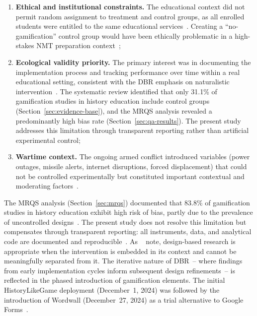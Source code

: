 \begin{enumerate}
\item \textbf{Ethical and institutional constraints.} The educational context did not permit random assignment to treatment and control groups, as all enrolled students were entitled to the same educational services~\cite{Sanina2020}. Creating a ``no-gamification'' control group would have been ethically problematic in a high-stakes NMT preparation context~\cite{CampbellStanley1963, ShadishCookCampbell2002};
\item \textbf{Ecological validity priority.} The primary interest was in documenting the implementation process and tracking performance over time within a real educational setting, consistent with the DBR emphasis on naturalistic intervention~\cite{Reeves2003, WangHannafin2005}. The systematic review identified that only 31.1\% of gamification studies in history education include control groups (Section~\ref{sec:evidence-base}), and the MRQS analysis revealed a predominantly high bias rate (Section~\ref{sec:qa-results}). The present study addresses this limitation through transparent reporting rather than artificial experimental control;
\item \textbf{Wartime context.} The ongoing armed conflict introduced variables (power outages, missile alerts, internet disruptions, forced displacement) that could not be controlled experimentally but constituted important contextual and moderating factors~\cite{Martynets202428, UNESCO2023, Burde2017, Kirk2007}.
\end{enumerate}

The MRQS analysis (Section~\ref{sec:mrqs}) documented that 83.8\% of gamification studies in history education exhibit high risk of bias, partly due to the prevalence of uncontrolled designs~\cite{Korniienko2025mrqs}. The present study does not resolve this limitation but compensates through transparent reporting: all instruments, data, and analytical code are documented and reproducible~\cite{Hamari2014, DichevDicheva2017}. As \citeauthor{AndersonShattuck2012}~\cite{AndersonShattuck2012} note, design-based research is appropriate when the intervention is embedded in its context and cannot be meaningfully separated from it. The iterative nature of DBR~-- where findings from early implementation cycles inform subsequent design refinements~-- is reflected in the phased introduction of gamification elements. The initial HistoryLikeGame deployment (December~1, 2024) was followed by the introduction of Wordwall (December~27, 2024) as a trial alternative to Google Forms~\cite{Bakker2018}.

